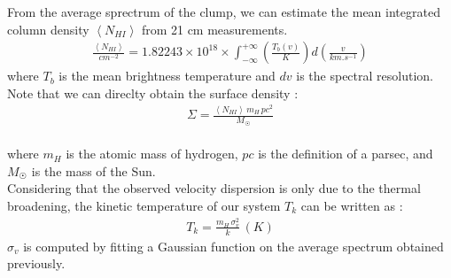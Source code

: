 \documentclass[a4paper,10.5pt]{report}
\begin{document}
\noindent From the average sprectrum of the clump, we can estimate the mean integrated column density 
$\left< N_{HI} \right>$ from 21 cm measurements. \\
\begin{align}
  \frac{\left< N_{HI} \right>}{cm^{-2}} = 1.82243 \times 10^{18} \times \int_{-\infty}^{+\infty} \left( \frac{T_b(v)}{K} \right) 
  d\left( \frac{v}{km.s^{-1}}\right)
  \label{eq::NHI}
\end{align} 
where $T_b$ is the mean brightness temperature and $dv$ is the spectral resolution. \\

\noindent Note that we can direclty obtain the surface density :
\begin{align}
  \Sigma = \frac{\left<N_{HI}\right> \, m_H \, pc^2}{M_\astrosun}
\end{align} \\
where $m_H$ is the atomic mass of hydrogen, $pc$ is the definition of a parsec,
and $M_{\astrosun}$ is the mass of the Sun. \\

Considering that the observed velocity dispersion is only due to the thermal broadening, the kinetic temperature 
of our system $T_k$ can be written as : 
\begin{align}
  T_k = \frac{m_H \, \sigma_v^2}{k} \, (K)
\end{align}
$\sigma_v$ is computed by fitting a Gaussian function on the average spectrum obtained previously.

\newpage
\end{document}
